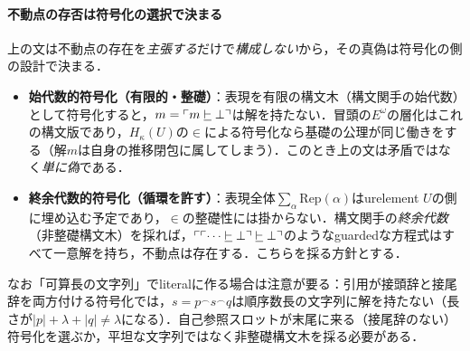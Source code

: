 \documentclass[../../main-detail.tex]{subfiles}
\begin{document}
\paragraph{不動点の存否は符号化の選択で決まる}
上の文は不動点の存在を\emph{主張する}だけで\emph{構成しない}から，その真偽は符号化の側の設計で決まる．
\begin{itemize}
    \item \textbf{始代数的符号化（有限的・整礎）}：表現を有限の構文木（構文関手の始代数）として符号化すると，$m = \ulcorner m \mathrel{\underline{\vdash}} \bot \urcorner$は解を持たない．冒頭の$E^\omega$の層化はこれの構文版であり，$H_\kappa(U)$の$\in$による符号化なら基礎の公理が同じ働きをする（解$m$は自身の推移閉包に属してしまう）．このとき上の文は矛盾ではなく\emph{単に偽}である．
    \item \textbf{終余代数的符号化（循環を許す）}：表現全体$\sum_\alpha \mathrm{Rep}(\alpha)$はurelement $U$の側に埋め込む予定であり，$\in$の整礎性には掛からない．構文関手の\emph{終余代数}（非整礎構文木）を採れば，$\ulcorner \ulcorner \cdots \mathrel{\underline{\vdash}} \bot \urcorner\mathrel{\underline{\vdash}}\bot \urcorner$のようなguardedな方程式はすべて一意解を持ち，不動点は存在する．こちらを採る方針とする．
\end{itemize}
\begin{remark}
なお「可算長の文字列」でliteralに作る場合は注意が要る：引用が接頭辞と接尾辞を両方付ける符号化では，$s = p^\frown s^\frown q$は順序数長の文字列に解を持たない（長さが$|p|+\lambda+|q| \neq \lambda$になる）．自己参照スロットが末尾に来る（接尾辞のない）符号化を選ぶか，平坦な文字列ではなく非整礎構文木を採る必要がある．
\end{remark}
\end{document}
